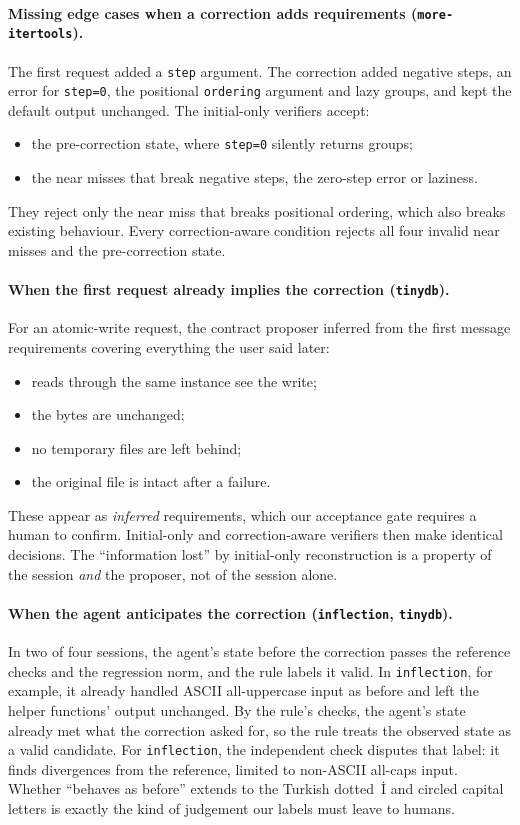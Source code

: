 \paragraph{Missing edge cases when a correction adds requirements (\texttt{more-itertools}).} The first request added a \texttt{step} argument. The correction added negative steps, an error for \texttt{step=0}, the positional \texttt{ordering} argument and lazy groups, and kept the default output unchanged. The initial-only verifiers accept:
\begin{itemize}
\item the pre-correction state, where \texttt{step=0} silently returns groups;
\item the near misses that break negative steps, the zero-step error or laziness.
\end{itemize}
They reject only the near miss that breaks positional ordering, which also breaks existing behaviour. Every correction-aware condition rejects all four invalid near misses and the pre-correction state.

\paragraph{When the first request already implies the correction (\texttt{tinydb}).} For an atomic-write request, the contract proposer inferred from the first message requirements covering everything the user said later:
\begin{itemize}
\item reads through the same instance see the write;
\item the bytes are unchanged;
\item no temporary files are left behind;
\item the original file is intact after a failure.
\end{itemize}
These appear as \emph{inferred} requirements, which our acceptance gate requires a human to confirm. Initial-only and correction-aware verifiers then make identical decisions. The ``information lost'' by initial-only reconstruction is a property of the session \emph{and} the proposer, not of the session alone.

\paragraph{When the agent anticipates the correction (\texttt{inflection}, \texttt{tinydb}).} In two of four sessions, the agent's state before the correction passes the reference checks and the regression norm, and the rule labels it valid. In \texttt{inflection}, for example, it already handled ASCII all-uppercase input as before and left the helper functions' output unchanged. By the rule's checks, the agent's state already met what the correction asked for, so the rule treats the observed state as a valid candidate. For \texttt{inflection}, the independent check disputes that label: it finds divergences from the reference, limited to non-ASCII all-caps input. Whether ``behaves as before'' extends to the Turkish dotted~İ and circled capital letters is exactly the kind of judgement our labels must leave to humans.

